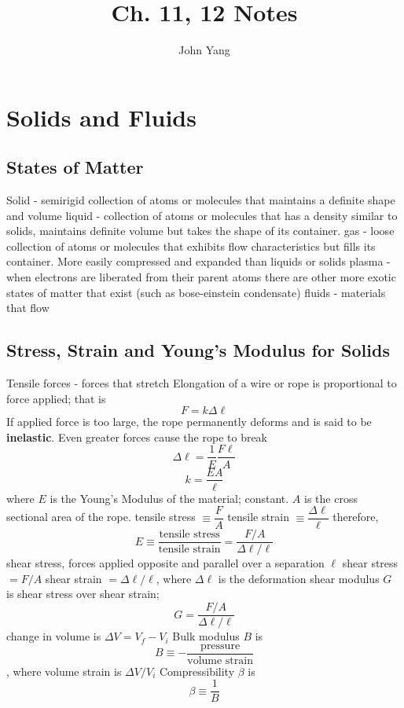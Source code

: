 \documentclass{article}
\title{Ch. 11, 12 Notes}
\author{John Yang}
\begin{document}
\maketitle
\section{Solids and Fluids}
\subsection{States of Matter}
\begin{outline}
    \1 Solid - semirigid collection of atoms or molecules that maintains a definite shape and volume
    \1 liquid - collection of atoms or molecules that has a density similar to solids, maintains definite volume but takes the shape of its container. 
    \1 gas - loose collection of atoms or molecules that exhibits flow characteristics but fills its container. More easily compressed and expanded than liquids or solids
    \1 plasma - when electrons are liberated from their parent atoms
    \1 there are other more exotic states of matter that exist (such as bose-einstein condensate)
    \1 fluids - materials that flow
\end{outline}
\subsection{Stress, Strain and Young's Modulus for Solids}
\begin{outline}
    \1 Tensile forces - forces that stretch
        \2 Elongation of a wire or rope is proportional to force applied; that is \[F=k\Delta \ell\]
    \1 If applied force is too large, the rope permanently deforms and is said to be \textbf{inelastic}. Even greater forces cause the rope to break
\0 \[\Delta \ell = \dfrac{1}{E} \dfrac{F\ell}{A}\] \[k=\dfrac{EA}{\ell}\]
    \1 where $E$ is the Young's Modulus of the material; constant. $A$ is the cross sectional area of the rope.
    \1 tensile stress $\equiv \dfrac{F}{A}$
    \1 tensile strain $\equiv\dfrac{\Delta \ell}{\ell}$
    \1 therefore, \[E\equiv\dfrac{\text{tensile stress}}{\text{tensile strain}}=\dfrac{F/A}{\Delta \ell/\ell}\]
    \1 shear stress, forces applied opposite and parallel over a separation $\ell$
    \1 shear stress $= F/A$
    \1 shear strain $=\Delta \ell/\ell$, where $\Delta \ell$ is the deformation
    \1 shear modulus $G$ is shear stress over shear strain;
    \[G=\dfrac{F/A}{\Delta \ell/\ell}\]
    \1 change in volume is $\Delta V = V_f-V_i$
    \1 Bulk modulus $B$ is \[B\equiv-\dfrac{\text{pressure}}{\text{volume strain}}\], where volume strain is $\Delta V/V_i$
    \1 Compressibility $\beta$ is \[\beta\equiv\dfrac{1}{B}\]
\end{outline}
\end{document}

